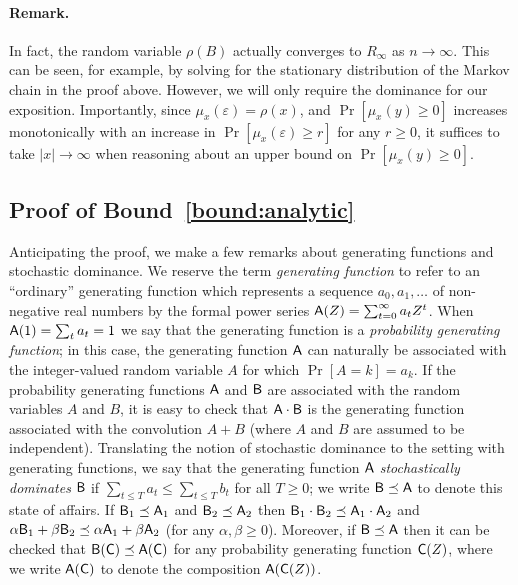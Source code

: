   \paragraph{Remark.} 
  In fact, the random variable $\rho(B)$
  actually converges to $R_\infty$ as $n \rightarrow \infty$. 
  This can be seen, for example, 
  by solving for the stationary distribution of the Markov chain in the proof above. 
  However, we will only require the dominance for our exposition. 
  Importantly, since $\mu_x(\varepsilon) = \rho(x)$, and 
  $\Pr[\mu_x(y) \geq 0]$ increases monotonically 
  with an increase in $\Pr[\mu_x(\varepsilon) \geq r]$ for any $r \geq 0$, 
  it suffices to take $|x| \rightarrow \infty$ 
  when reasoning about an upper bound on $\Pr[\mu_x(y) \geq 0]$. 

\subsection{Proof of Bound~\ref{bound:analytic}}\label{sec:gf-proof}

  Anticipating the proof, we make a few remarks about generating
  functions and stochastic dominance.  We reserve the term
  \emph{generating function} to refer to an ``ordinary'' generating
  function which represents a sequence $a_0, a_1, \ldots$ of
  non-negative real numbers by the formal power series
  $\mathsf{A}(Z) = \sum_{t = 0}^\infty a_t Z^t$. When
  $\mathsf{A}(1) = \sum_t a_t = 1$ we say that the generating function is
  a \emph{probability generating function}; in this case, the
  generating function $\mathsf{A}$ can naturally be associated with the
  integer-valued random variable $A$ for which $\Pr[A = k] = a_k$. If
  the probability generating functions $\mathsf{A}$ and $\mathsf{B}$ are
  associated with the random variables $A$ and $B$, it is easy to
  check that $\mathsf{A} \cdot \mathsf{B}$ is the generating function
  associated with the convolution $A + B$ (where $A$ and $B$ are
  assumed to be independent).  Translating the notion of stochastic
  dominance to the setting with generating functions, we say that the
  generating function $\mathsf{A}$ \emph{stochastically dominates}
  $\mathsf{B}$ if $\sum_{t \leq T} a_t \leq \sum_{t \leq T} b_t$ for all
  $T \geq 0$; we write $\mathsf{B} \preceq \mathsf{A}$ to denote this state of
  affairs. If $\mathsf{B}_1 \preceq \mathsf{A}_1$ and
  $\mathsf{B}_2 \preceq \mathsf{A}_2$ then
  $\mathsf{B}_1 \cdot \mathsf{B}_2 \preceq \mathsf{A}_1 \cdot \mathsf{A}_2$ and
  $\alpha \mathsf{B}_1 + \beta \mathsf{B}_2 \preceq \alpha \mathsf{A}_1 + \beta
  \mathsf{A}_2$ (for any $\alpha, \beta \geq 0$).  Moreover, if
  $\mathsf{B} \preceq \mathsf{A}$ then it can be checked that
  $\mathsf{B}(\mathsf{C}) \preceq \mathsf{A}(\mathsf{C})$ for any probability
  generating function $\mathsf{C}(Z)$, where we write $\mathsf{A}(\mathsf{C})$ to
  denote the composition $\mathsf{A}(\mathsf{C}(Z))$.


